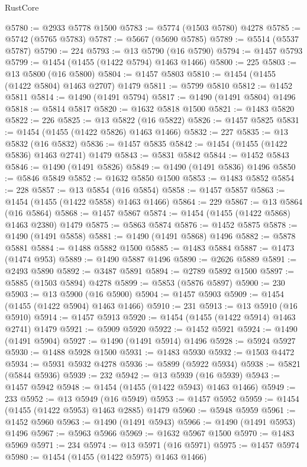 \begin{lexlean}{RustCore}
\begin{coremodule}
@5780 := @2933 @5778 @1500
@5783 := @5774 (@1503 @5780) @4278
@5785 := @5742 (@5765 @5783)
@5787 := @5667 (@5690 @5785)
@5789 := @5514 (@5537 @5787)
@5790 := 224
@5793 := @13 @5790 (@16 @5790)
@5794 := @1457 @5793
@5799 := @1454 (@1455 (@1422 @5794) @1463 @1466)
@5800 := 225
@5803 := @13 @5800 (@16 @5800)
@5804 := @1457 @5803
@5810 := @1454 (@1455 (@1422 @5804) @1463 @2707) @1479
@5811 := @5799 @5810
@5812 := @1452 @5811
@5814 := @1490 (@1491 @5794)
@5817 := @1490 (@1491 @5804) @1496
@5818 := @5814 @5817
@5820 := @1632 @5818 @1500
@5821 := @1483 @5820
@5822 := 226
@5825 := @13 @5822 (@16 @5822)
@5826 := @1457 @5825
@5831 := @1454 (@1455 (@1422 @5826) @1463 @1466)
@5832 := 227
@5835 := @13 @5832 (@16 @5832)
@5836 := @1457 @5835
@5842 := @1454 (@1455 (@1422 @5836) @1463 @2741) @1479
@5843 := @5831 @5842
@5844 := @1452 @5843
@5846 := @1490 (@1491 @5826)
@5849 := @1490 (@1491 @5836) @1496
@5850 := @5846 @5849
@5852 := @1632 @5850 @1500
@5853 := @1483 @5852
@5854 := 228
@5857 := @13 @5854 (@16 @5854)
@5858 := @1457 @5857
@5863 := @1454 (@1455 (@1422 @5858) @1463 @1466)
@5864 := 229
@5867 := @13 @5864 (@16 @5864)
@5868 := @1457 @5867
@5874 := @1454 (@1455 (@1422 @5868) @1463 @2380) @1479
@5875 := @5863 @5874
@5876 := @1452 @5875
@5878 := @1490 (@1491 @5858)
@5881 := @1490 (@1491 @5868) @1496
@5882 := @5878 @5881
@5884 := @1488 @5882 @1500
@5885 := @1483 @5884
@5887 := @1473 (@1474 @953)
@5889 := @1490 @5887 @1496
@5890 := @2626 @5889
@5891 := @2493 @5890
@5892 := @3487 @5891
@5894 := @2789 @5892 @1500
@5897 := @5885 (@1503 @5894) @4278
@5899 := @5853 (@5876 @5897)
@5900 := 230
@5903 := @13 @5900 (@16 @5900)
@5904 := @1457 @5903
@5909 := @1454 (@1455 (@1422 @5904) @1463 @1466)
@5910 := 231
@5913 := @13 @5910 (@16 @5910)
@5914 := @1457 @5913
@5920 := @1454 (@1455 (@1422 @5914) @1463 @2741) @1479
@5921 := @5909 @5920
@5922 := @1452 @5921
@5924 := @1490 (@1491 @5904)
@5927 := @1490 (@1491 @5914) @1496
@5928 := @5924 @5927
@5930 := @1488 @5928 @1500
@5931 := @1483 @5930
@5932 := @1503 @4472
@5934 := @5931 @5932 @4278
@5936 := @5899 (@5922 @5934)
@5938 := @5821 (@5844 @5936)
@5939 := 232
@5942 := @13 @5939 (@16 @5939)
@5943 := @1457 @5942
@5948 := @1454 (@1455 (@1422 @5943) @1463 @1466)
@5949 := 233
@5952 := @13 @5949 (@16 @5949)
@5953 := @1457 @5952
@5959 := @1454 (@1455 (@1422 @5953) @1463 @2885) @1479
@5960 := @5948 @5959
@5961 := @1452 @5960
@5963 := @1490 (@1491 @5943)
@5966 := @1490 (@1491 @5953) @1496
@5967 := @5963 @5966
@5969 := @1632 @5967 @1500
@5970 := @1483 @5969
@5971 := 234
@5974 := @13 @5971 (@16 @5971)
@5975 := @1457 @5974
@5980 := @1454 (@1455 (@1422 @5975) @1463 @1466)

\end{coremodule}
\end{lexlean}
